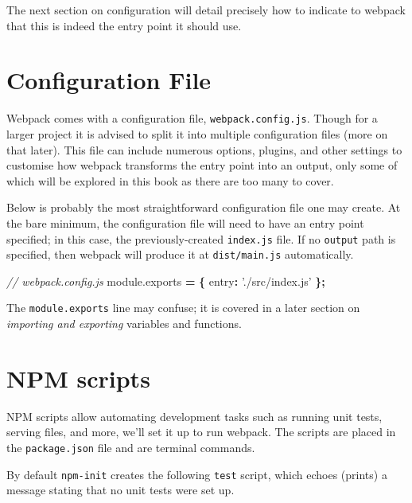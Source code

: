 \documentclass[10pt,]{krantz}
\makeatletter
\newenvironment{Shaded}{\begin{snugshade}}{\end{snugshade}}
\newcommand{\AttributeTok}[1]{\textcolor[rgb]{0.61,0.61,0.61}{#1}}
\newcommand{\CommentTok}[1]{\textcolor[rgb]{0.37,0.37,0.37}{\textit{#1}}}
\newcommand{\DataTypeTok}[1]{\textcolor[rgb]{0.27,0.27,0.27}{#1}}
\newcommand{\NormalTok}[1]{#1}
\newcommand{\OperatorTok}[1]{\textcolor[rgb]{0.43,0.43,0.43}{\textbf{#1}}}
\newcommand{\StringTok}[1]{\textcolor[rgb]{0.5,0.5,0.5}{#1}}
\newcommand{\VariableTok}[1]{\textcolor[rgb]{0,0,0}{#1}}
\newenvironment{kframe}{%
\medskip{}
\setlength{\fboxsep}{.8em}
 \def\at@end@of@kframe{}%
 \ifinner\ifhmode%
  \def\at@end@of@kframe{\end{minipage}}%
  \begin{minipage}{\columnwidth}%
 \fi\fi%
 \def\FrameCommand##1{\hskip\@totalleftmargin \hskip-\fboxsep
 \colorbox{shadecolor}{##1}\hskip-\fboxsep
     \hskip-\linewidth \hskip-\@totalleftmargin \hskip\columnwidth}%
 \MakeFramed {\advance\hsize-\width
   \@totalleftmargin\z@ \linewidth\hsize
   \@setminipage}}%
 {\par\unskip\endMakeFramed%
 \at@end@of@kframe}
\renewenvironment{Shaded}{\begin{kframe}}{\end{kframe}}
\makeatother
\begin{document}
The next section on configuration will detail precisely how to indicate to webpack that this is indeed the entry point it should use.

\hypertarget{webpack-intro-conf}{%
\section{Configuration File}\label{webpack-intro-conf}}

Webpack comes with a configuration file, \texttt{webpack.config.js}. Though for a larger project it is advised to split it into multiple configuration files (more on that later). This file can include numerous options, plugins, and other settings to customise how webpack transforms the entry point into an output, only some of which will be explored in this book as there are too many to cover.

Below is probably the most straightforward configuration file one may create. At the bare minimum, the configuration file will need to have an entry point specified; in this case, the previously-created \texttt{index.js} file. If no \texttt{output} path is specified, then webpack will produce it at \texttt{dist/main.js} automatically.

\begin{Shaded}
\begin{Highlighting}[]
\CommentTok{// webpack.config.js}
\VariableTok{module}\NormalTok{.}\AttributeTok{exports} \OperatorTok{=} \OperatorTok{\{}
  \DataTypeTok{entry}\OperatorTok{:} \StringTok{'./src/index.js'}
\OperatorTok{\};}
\end{Highlighting}
\end{Shaded}

The \texttt{module.exports} line may confuse; it is covered in a later section on \emph{importing and exporting} variables and functions.

\hypertarget{webpack-intro-npm-scripts}{%
\section{NPM scripts}\label{webpack-intro-npm-scripts}}

NPM scripts allow automating development tasks such as running unit tests, serving files, and more, we'll set it up to run webpack. The scripts are placed in the \texttt{package.json} file and are terminal commands.

By default \texttt{npm-init} creates the following \texttt{test} script, which echoes (prints) a message stating that no unit tests were set up.
\end{document}
